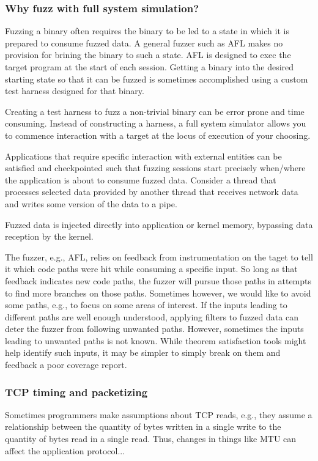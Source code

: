 \documentclass[titlepage]{article}
\begin{document}
\subsubsection{Why fuzz with full system simulation?}
Fuzzing a binary often requires the binary to be led to a state in which it is prepared
to consume fuzzed data. A general fuzzer such as AFL makes no provision for brining the 
binary to such a state.  AFL is designed to exec the target program at the start of each
session.  Getting a binary into the desired starting state so that it can be fuzzed is
sometimes accomplished using a custom test harness designed for that binary.

Creating a test harness to fuzz a non-trivial binary can be error prone and time consuming.
Instead of constructing a harness, a full system simulator allows you to commence interaction
with a target at the locus of execution of your choosing.

Applications that require specific interaction with external entities can be satisfied and checkpointed
such that fuzzing sessions start precisely when/where the application is about to consume fuzzed data.
Consider a thread that processes selected data provided by another thread that receives network data
and writes some version of the data to a pipe.

Fuzzed data is injected directly into application or kernel memory, bypassing data reception by the kernel.

The fuzzer, e.g., AFL, relies on feedback from instrumentation on the taget to tell it which code paths
were hit while consuming a specific input.  So long as that feedback indicates new code paths, the fuzzer
will pursue those paths in attempts to find more branches on those paths.  Sometimes however, we would like
to avoid some paths, e.g., to focus on some areas of interest.  If the inputs leading to different paths
are well enough understood, applying filters to fuzzed data can deter the fuzzer from following unwanted paths.
However, sometimes the inputs leading to unwanted paths is not known.  While theorem satisfaction tools might
help identify such inputs, it may be simpler to simply break on them and feedback a poor coverage report.
\subsubsection{TCP timing and packetizing}
Sometimes programmers make assumptions about TCP reads, e.g., they assume a relationship between the quantity of bytes written in a single write to the
quantity of bytes read in a single read.  Thus, changes in things like MTU can affect the application protocol...
\end{document}
